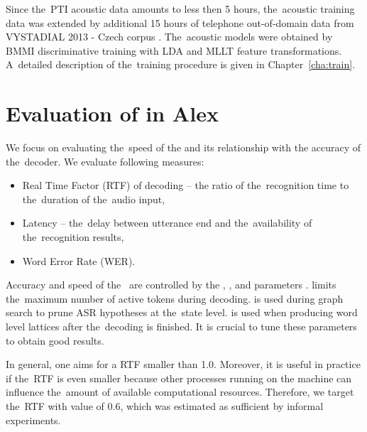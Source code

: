 Since the~PTI acoustic data amounts to less then 5 hours, the~acoustic training data was extended by additional 15 hours of telephone out-of-domain data from VYSTADIAL 2013 - Czech corpus \cite{korvas_2014}.
The~acoustic models were obtained by BMMI discriminative training with LDA and MLLT feature transformations.
A~detailed description of the~training procedure is given in Chapter~\ref{cha:train}. 


\section{Evaluation of  in Alex}
\label{sec:eval}
We focus on evaluating the~speed of the  and its relationship with the accuracy of the~decoder.
We evaluate following measures:
\begin{itemize}
    \item Real Time Factor (RTF) of decoding -- the ratio of the~recognition time to the~duration of the~audio input,
    \item Latency -- the~delay between utterance end and the~availability of the~recognition results,
    \item Word Error Rate (WER).
\end{itemize}

Accuracy and speed of the~ are controlled by the ,   , and  parameters \cite{povey2011kaldi}.
 limits the~maximum number of active tokens during decoding.
 is used during graph search to prune ASR hypotheses at the~state level.
 is used when producing word level lattices after the~decoding is finished.
It is crucial to tune these parameters to obtain good results.

In general, one aims for a \ac{RTF} smaller than 1.0.
Moreover, it is useful in practice if the~RTF is even smaller because other processes running on the machine can influence the~amount of available computational resources.
Therefore, we target the~RTF with value of 0.6, which was estimated as sufficient by informal experiments.

